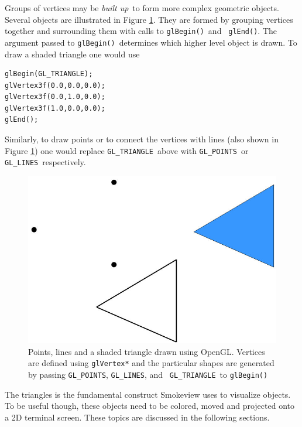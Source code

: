 \documentclass[11pt,twoside]{book}
\begin{document}
Groups of vertices may be {\em built up}\ to form more complex geometric objects.
Several objects are illustrated in Figure \ref{figshapes}.  They are formed by grouping vertices together
and surrounding them with calls to {\tt glBegin()}\ and {\tt
glEnd()}. The argument passed to {\tt glBegin()}\ determines which higher level object is drawn.
To draw a shaded triangle one would use
\begin{verbatim}
glBegin(GL_TRIANGLE);
glVertex3f(0.0,0.0,0.0);
glVertex3f(0.0,1.0,0.0);
glVertex3f(1.0,0.0,0.0);
glEnd();
\end{verbatim}
Similarly, to draw points or to connect the vertices with lines (also shown
in Figure \ref{figshapes}) one would replace {\tt GL\_TRIANGLE}\ above
with {\tt GL\_POINTS}\ or {\tt GL\_LINES}\ respectively.
\begin{figure}[t]
\begin{center}
\includegraphics[width=6.0in]{figures/shapes}
\end{center}
\caption[Points, lines and a shaded triangle drawn using OpenGL.]
{Points, lines and a shaded triangle drawn using OpenGL. Vertices
are defined using {\tt glVertex*} and the particular shapes are
generated by passing {\tt GL\_POINTS}, {\tt GL\_LINES}, and {\tt
GL\_TRIANGLE}\ to {\tt glBegin()} } \label{figshapes}
\end{figure}

The triangles is the fundamental construct Smokeview uses to
visualize objects.  To be useful though, these objects need to be
colored, moved and projected onto a 2D terminal screen. These
topics are discussed in the following sections.

%
%
\end{document}
